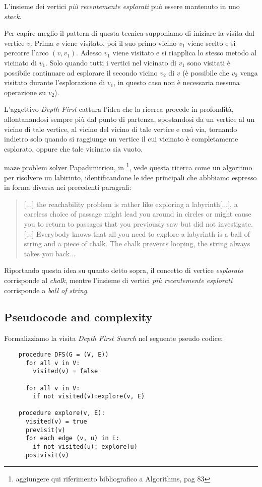 L'insieme dei vertici \emph{pi\`u recentemente esplorati} pu\`o essere
mantenuto in uno \emph{stack}.

Per capire meglio il pattern di questa tecnica supponiamo di iniziare
la visita dal vertice $v$. Prima $v$ viene visitato, poi il suo primo
vicino $v_{1}$ viene scelto e si percorre l'arco $(v, v_{1})$. Adesso
$v_{1}$ viene visitato e si riapplica lo stesso metodo al vicinato di
$v_{1}$. Solo quando tutti i vertici nel vicinato di $v_{1}$ sono
visitati \`e possibile continuare ad esplorare il secondo vicino
$v_{2}$ di $v$ (\`e possibile che $v_{2}$ venga visitato durante
l'esplorazione di $v_{1}$, in questo caso non \`e necessaria nessuna
operazione su $v_{2}$).

L'aggettivo \emph{Depth First} cattura l'idea che la ricerca procede
in profondit\`a, allontanandosi sempre pi\`u dal punto di partenza,
spostandosi da un vertice al un vicino di tale vertice, al vicino del
vicino di tale vertice e cos\`i via, tornando indietro solo quando si
raggiunge un vertice il cui vicinato \`e completamente esplorato,
oppure che tale vicinato sia vuoto.

\begin{paragraph}{maze problem solver}
  Papadimitriou, in \footnote{aggiungere qui riferimento bibliografico
    a Algorithms, pag 83}, vede questa ricerca come un algoritmo per
  risolvere un labirinto, identificandone le idee principali che
  abbbiamo espresso in forma diversa nei precedenti paragrafi:
\begin{quotation}
  [...] the reachability problem is rather like exploring a
  labyrinth[...], a careless choice of passage might lead you around
  in circles or might cause you to return to passages that you
  previously saw but did not investigate.[...] Everybody knows that
  all you need to explore a labyrinth is a ball of string and a piece
  of chalk. The chalk prevents looping, the string always takes you
  back...
\end{quotation}
Riportando questa idea su quanto detto sopra, il concetto di vertice
\emph{esplorato} corrisponde al \emph{chalk}, mentre l'insieme di
vertici \emph{pi\`u recentemente esplorati} corrisponde a \emph{ball
  of string}.
\end{paragraph}

\subsection{Pseudocode and complexity}
Formalizziamo la visita \emph{Depth First Search} nel seguente pseudo
codice:
\begin{lstlisting}
    procedure DFS(G = (V, E))
      for all v in V:
        visited(v) = false

      for all v in V:
        if not visited(v):explore(v, E)

    procedure explore(v, E):
      visited(v) = true
      previsit(v)
      for each edge (v, u) in E:
        if not visited(u): explore(u)
      postvisit(v)
\end{lstlisting}

